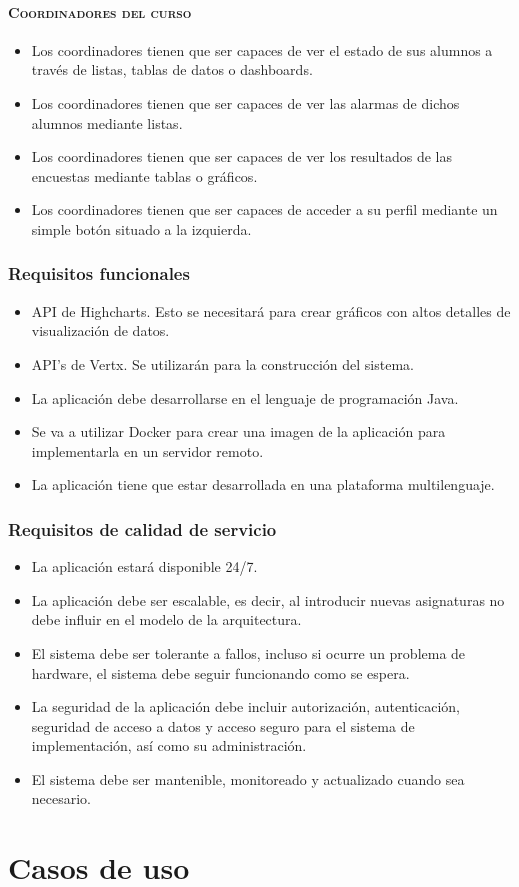 \paragraph{\textsc {Coordinadores del curso}}
\begin{itemize}
\item {Los coordinadores tienen que ser capaces de ver el estado de
  sus alumnos a través de listas, tablas de datos o dashboards.}
\item {Los coordinadores tienen que ser capaces de ver las alarmas de
  dichos alumnos mediante listas.}
\item {Los coordinadores tienen que ser capaces de ver los resultados
  de las encuestas mediante tablas o gráficos.}
\item {Los coordinadores tienen que ser capaces de acceder a su perfil
  mediante un simple botón situado a la izquierda.}
\end{itemize}
\subsubsection{Requisitos funcionales}
\begin{itemize}
\item {API de Highcharts. Esto se necesitará para crear gráficos con
  altos detalles de visualización de datos.}
\item {API’s de Vertx. Se utilizarán para la construcción del
  sistema. }
\item {La aplicación debe desarrollarse en el lenguaje de programación
  Java.}
\item {Se va a utilizar Docker para crear una imagen de la aplicación
  para implementarla en un servidor remoto.}
\item {La aplicación tiene que estar desarrollada en una plataforma
  multilenguaje.}
\end{itemize}
\subsubsection{Requisitos de calidad de servicio}
\begin{itemize}
\item {La aplicación estará disponible 24/7.}
\item {La aplicación debe ser escalable, es decir, al introducir
  nuevas asignaturas no debe influir en el modelo de la arquitectura.}
\item {El sistema debe ser tolerante a fallos, incluso si ocurre un
  problema de hardware, el sistema debe seguir funcionando como se
  espera.}
\item {La seguridad de la aplicación debe incluir autorización,
  autenticación, seguridad de acceso a datos y acceso seguro para el
  sistema de implementación, así como su administración.}
\item {El sistema debe ser mantenible, monitoreado y actualizado
  cuando sea necesario.}
\end{itemize}
\section{Casos de uso}
